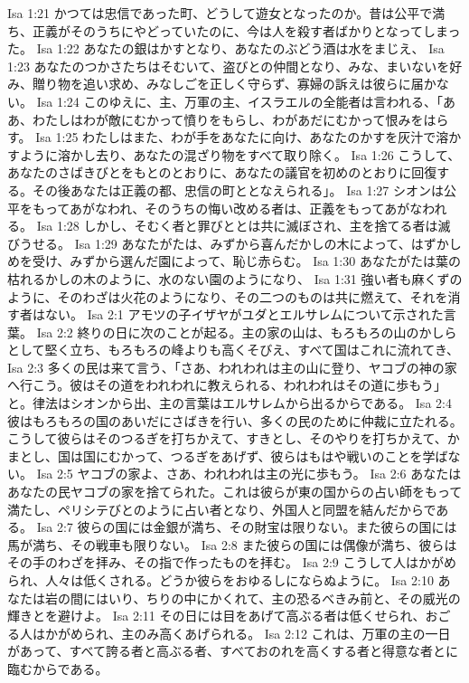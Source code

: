 Isa 1:21  かつては忠信であった町、どうして遊女となったのか。昔は公平で満ち、正義がそのうちにやどっていたのに、今は人を殺す者ばかりとなってしまった。
Isa 1:22  あなたの銀はかすとなり、あなたのぶどう酒は水をまじえ、
Isa 1:23  あなたのつかさたちはそむいて、盗びとの仲間となり、みな、まいないを好み、贈り物を追い求め、みなしごを正しく守らず、寡婦の訴えは彼らに届かない。
Isa 1:24  このゆえに、主、万軍の主、イスラエルの全能者は言われる、「ああ、わたしはわが敵にむかって憤りをもらし、わがあだにむかって恨みをはらす。
Isa 1:25  わたしはまた、わが手をあなたに向け、あなたのかすを灰汁で溶かすように溶かし去り、あなたの混ざり物をすべて取り除く。
Isa 1:26  こうして、あなたのさばきびとをもとのとおりに、あなたの議官を初めのとおりに回復する。その後あなたは正義の都、忠信の町ととなえられる」。
Isa 1:27  シオンは公平をもってあがなわれ、そのうちの悔い改める者は、正義をもってあがなわれる。
Isa 1:28  しかし、そむく者と罪びととは共に滅ぼされ、主を捨てる者は滅びうせる。
Isa 1:29  あなたがたは、みずから喜んだかしの木によって、はずかしめを受け、みずから選んだ園によって、恥じ赤らむ。
Isa 1:30  あなたがたは葉の枯れるかしの木のように、水のない園のようになり、
Isa 1:31  強い者も麻くずのように、そのわざは火花のようになり、その二つのものは共に燃えて、それを消す者はない。
Isa 2:1  アモツの子イザヤがユダとエルサレムについて示された言葉。
Isa 2:2  終りの日に次のことが起る。主の家の山は、もろもろの山のかしらとして堅く立ち、もろもろの峰よりも高くそびえ、すべて国はこれに流れてき、
Isa 2:3  多くの民は来て言う、「さあ、われわれは主の山に登り、ヤコブの神の家へ行こう。彼はその道をわれわれに教えられる、われわれはその道に歩もう」と。律法はシオンから出、主の言葉はエルサレムから出るからである。
Isa 2:4  彼はもろもろの国のあいだにさばきを行い、多くの民のために仲裁に立たれる。こうして彼らはそのつるぎを打ちかえて、すきとし、そのやりを打ちかえて、かまとし、国は国にむかって、つるぎをあげず、彼らはもはや戦いのことを学ばない。
Isa 2:5  ヤコブの家よ、さあ、われわれは主の光に歩もう。
Isa 2:6  あなたはあなたの民ヤコブの家を捨てられた。これは彼らが東の国からの占い師をもって満たし、ペリシテびとのように占い者となり、外国人と同盟を結んだからである。
Isa 2:7  彼らの国には金銀が満ち、その財宝は限りない。また彼らの国には馬が満ち、その戦車も限りない。
Isa 2:8  また彼らの国には偶像が満ち、彼らはその手のわざを拝み、その指で作ったものを拝む。
Isa 2:9  こうして人はかがめられ、人々は低くされる。どうか彼らをおゆるしにならぬように。
Isa 2:10  あなたは岩の間にはいり、ちりの中にかくれて、主の恐るべきみ前と、その威光の輝きとを避けよ。
Isa 2:11  その日には目をあげて高ぶる者は低くせられ、おごる人はかがめられ、主のみ高くあげられる。
Isa 2:12  これは、万軍の主の一日があって、すべて誇る者と高ぶる者、すべておのれを高くする者と得意な者とに臨むからである。
